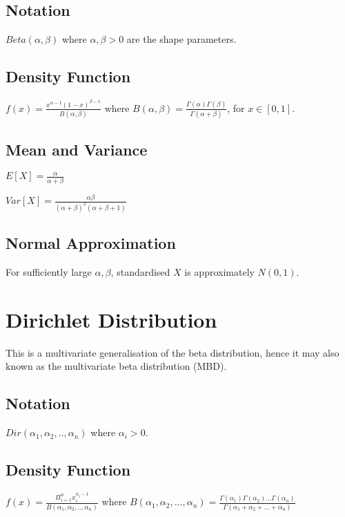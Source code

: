 \documentclass{article}
\begin{document}
\begin{multicols*}{3}
\subsection*{Notation}

$Beta(\alpha, \beta)$ where $\alpha,\beta > 0$ are the shape parameters.

\subsection*{Density Function}

$f(x) = \frac{x^{\alpha - 1} (1 - x)^{\beta - 1}}{B(\alpha,\beta)}$ where $B(\alpha, \beta) = \frac{\Gamma(\alpha)\Gamma(\beta)}{\Gamma(\alpha + \beta)}$, for $x \in [0, 1]$.

\subsection*{Mean and Variance}

$E[X] = \frac{\alpha}{\alpha + \beta}$

$Var[X] = \frac{\alpha \beta}{(\alpha + \beta)^2(\alpha + \beta + 1)}$

\subsection*{Normal Approximation}

For sufficiently large $\alpha, \beta$, standardised $X$ is approximately $N(0,1)$.

\section{Dirichlet Distribution}
\label{sec:dirichlet-dist}

This is a multivariate generalisation of the beta distribution, hence it may also known as the multivariate beta distribution (MBD).

\subsection*{Notation}

$Dir(\alpha_{1}, \alpha_{2}, .., \alpha_{n})$ where $\alpha_{i} > 0$.

\subsection*{Density Function}

$f(x) = \frac{\Pi_{i=1}^{n} x_{i}^{\alpha_{i} - 1}}{B(\alpha_{1}, \alpha_{2}, .., \alpha_{n})}$
where $B(\alpha_{1}, \alpha_{2}, ..., \alpha_{n}) = \frac{\Gamma(\alpha_{1})\Gamma(\alpha_{2})...\Gamma(\alpha_{n})}{\Gamma(\alpha_{1} + \alpha_{2} + ... + \alpha_{n})}$


\end{multicols*}
\end{document}
